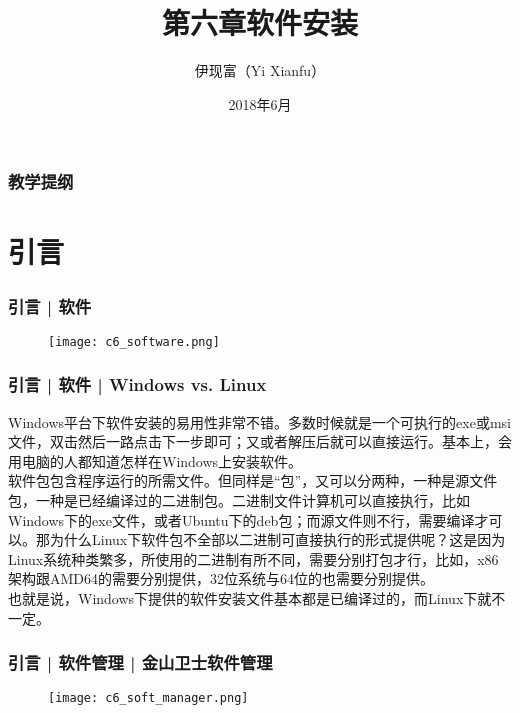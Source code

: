 



\title[软件安装]{第六章\quad 软件安装}
\author[Yixf]{伊现富（Yi Xianfu）}
\date{2018年6月}


\begin{frame}
  \titlepage
\end{frame}

\begin{frame}[plain,label=current]
  \frametitle{教学提纲}
  \setcounter{tocdepth}{3}
  \begin{multicols}{2}
    \tableofcontents
  \end{multicols}
\end{frame}


\section{引言}
\begin{frame}
  \frametitle{引言 | 软件}
  \begin{figure}
    \centering
    \texttt{[image: c6\_software.png]}
  \end{figure}
\end{frame}

\begin{frame}
  \frametitle{引言 | 软件 | Windows vs. Linux}
  Windows平台下软件安装的易用性非常不错。多数时候就是一个可执行的exe或msi文件，双击然后一路点击下一步即可；又或者解压后就可以直接运行。基本上，会用电脑的人都知道怎样在Windows上安装软件。\\
  \vspace{5pt}
  软件包包含程序运行的所需文件。但同样是“包”，又可以分两种，一种是源文件包，一种是已经编译过的二进制包。二进制文件计算机可以直接执行，比如Windows下的exe文件，或者Ubuntu下的deb包；而源文件则不行，需要编译才可以。那为什么Linux下软件包不全部以二进制可直接执行的形式提供呢？这是因为Linux系统种类繁多，所使用的二进制有所不同，需要分别打包才行，比如，x86架构跟AMD64的需要分别提供，32位系统与64位的也需要分别提供。\\
  \vspace{5pt}
  也就是说，Windows下提供的软件安装文件基本都是已编译过的，而Linux下就不一定。
\end{frame}

\begin{frame}
  \frametitle{引言 | 软件管理 | 金山卫士软件管理}
  \begin{figure}
    \centering
    \texttt{[image: c6\_soft\_manager.png]}
  \end{figure}
\end{frame}

